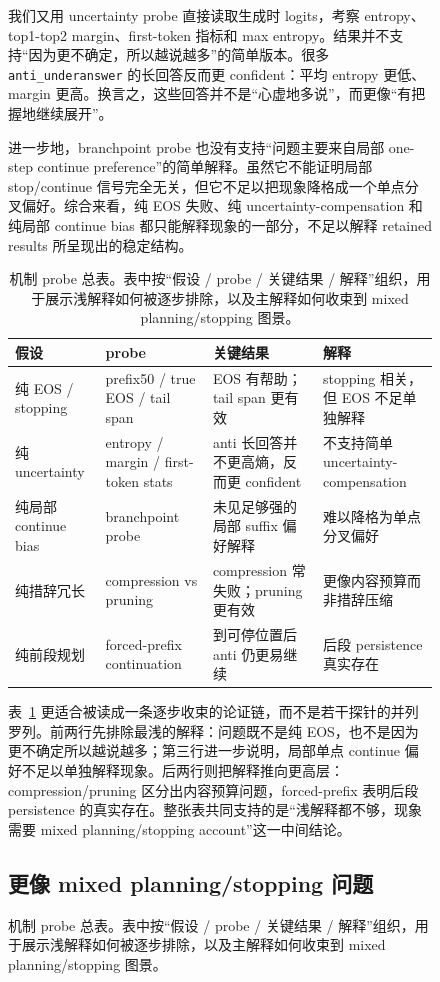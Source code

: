 \documentclass[12pt]{ctexart}
\begin{document}
\begin{figure}[t]
我们又用 uncertainty probe 直接读取生成时 logits，考察 entropy、top1-top2 margin、first-token 指标和 max entropy。结果并不支持“因为更不确定，所以越说越多”的简单版本。很多 \texttt{anti\_underanswer} 的长回答反而更 confident：平均 entropy 更低、margin 更高。换言之，这些回答并不是“心虚地多说”，而更像“有把握地继续展开”。

进一步地，branchpoint probe 也没有支持“问题主要来自局部 one-step continue preference”的简单解释。虽然它不能证明局部 stop/continue 信号完全无关，但它不足以把现象降格成一个单点分叉偏好。综合来看，纯 EOS 失败、纯 uncertainty-compensation 和纯局部 continue bias 都只能解释现象的一部分，不足以解释 retained results 所呈现出的稳定结构。

\begin{table}[t]
\centering
\caption{机制 probe 总表。表中按“假设 / probe / 关键结果 / 解释”组织，用于展示浅解释如何被逐步排除，以及主解释如何收束到 mixed planning/stopping 图景。}
\label{tab:mechanism-probes}
\begin{tabular}{p{2.2cm}p{3.1cm}p{4.8cm}p{4.3cm}}
\toprule
假设 & probe & 关键结果 & 解释 \\
\midrule
纯 EOS / stopping & prefix50 / true EOS / tail span & EOS 有帮助；tail span 更有效 & stopping 相关，但 EOS 不足单独解释 \\
纯 uncertainty & entropy / margin / first-token stats & anti 长回答并不更高熵，反而更 confident & 不支持简单 uncertainty-compensation \\
纯局部 continue bias & branchpoint probe & 未见足够强的局部 suffix 偏好解释 & 难以降格为单点分叉偏好 \\
纯措辞冗长 & compression vs pruning & compression 常失败；pruning 更有效 & 更像内容预算而非措辞压缩 \\
纯前段规划 & forced-prefix continuation & 到可停位置后 anti 仍更易继续 & 后段 persistence 真实存在 \\
\bottomrule
\end{tabular}
\end{table}

表~\ref{tab:mechanism-probes} 更适合被读成一条逐步收束的论证链，而不是若干探针的并列罗列。前两行先排除最浅的解释：问题既不是纯 EOS，也不是因为更不确定所以越说越多；第三行进一步说明，局部单点 continue 偏好不足以单独解释现象。后两行则把解释推向更高层：compression/pruning 区分出内容预算问题，forced-prefix 表明后段 persistence 的真实存在。整张表共同支持的是“浅解释都不够，现象需要 mixed planning/stopping account”这一中间结论。

\subsection{更像 mixed planning/stopping 问题}


\end{figure}
\end{document}
